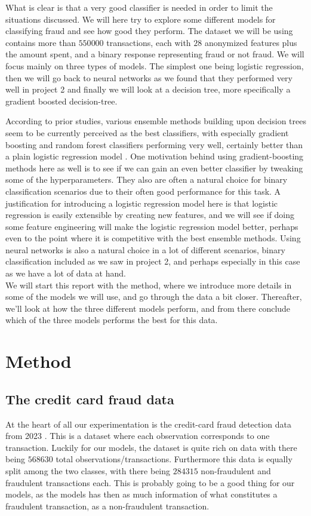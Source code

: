 \documentclass{article}
\begin{document}
What is clear is that a very good classifier is needed in order to limit
the situations discussed. We will here try to explore some different models
for classifying fraud and see how good they perform. The dataset we will be
using contains more than $550 000$ transactions, each with $28$ anonymized
features plus the amount spent, and a binary response representing fraud or not
fraud. We will focus mainly on three types of models. The simplest one being
logistic regression, then we will go back to neural networks as we found that
they performed very well in project 2 \cite{reportproject2} and finally
we will look at a decision tree, more specifically a gradient boosted
decision-tree.

According to prior studies, various ensemble methods building upon decision
trees seem to be currently perceived as the best classifiers, with especially
gradient boosting and random forest classifiers performing very well, certainly
better than a plain logistic regression model \cite[s.~Model Performance
	Conclusions]{kaggle100paccuracy}.  One motivation behind using
gradient-boosting methods here as well is to see if we can gain an even
better classifier by tweaking some of the hyperparameters.  They also are
often a natural choice for binary classification scenarios due to their
often good performance for this task.  A justification for introducing a
logistic regression model here is that logistic regression is easily
extensible by creating new features, and we will see if doing some feature
engineering will make the logistic regression model better, perhaps even to
the point where it is competitive with the best ensemble methods. Using neural
networks is also a natural choice in a lot of different scenarios, binary
classification included as we saw in project 2, and perhaps especially in this
case as we have a lot of data at hand.
\\

We will start this report with the method, where we introduce more details in
some of the models we will use, and go through the data a bit closer.
Thereafter, we'll look at how the three different models perform, and from there
conclude which of the three models performs the best for this data.

\section{Method}
\subsection{The credit card fraud data}
\label{methoddata}
At the heart of all our experimentation is the credit-card fraud detection
data from 2023 \cite{kaggleccdata}. This is a dataset where each observation
corresponds to one transaction. Luckily for our models, the dataset is quite
rich on data with there being $568630$ total observations/transactions.
Furthermore this data is equally split among the two classes, with there being
$284315$ non-fraudulent and fraudulent transactions each. This is probably going
to be a good thing for our models, as the models has then as much information of
what constitutes a fraudulent transaction, as a non-fraudulent transaction.
\end{document}
